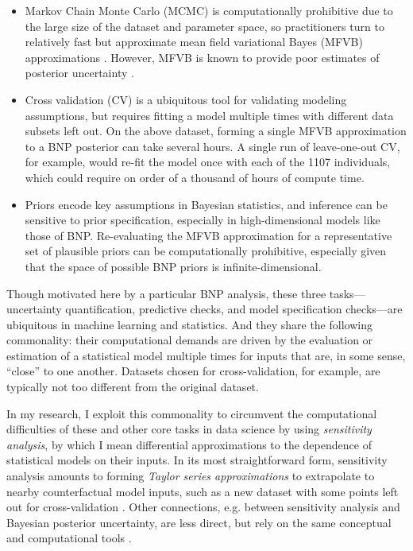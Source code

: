 \begin{itemize}
%
\item Markov Chain Monte Carlo (MCMC) is computationally prohibitive due to the
large size of the dataset and parameter space, so practitioners turn to
relatively fast but approximate mean field variational Bayes (MFVB)
approximations \citep{blei:2006:bnp, raj:2014:faststructure}. However, MFVB is
known to provide poor estimates of posterior uncertainty
\citep{turner:2011:two}.
%
\item Cross validation (CV) is a ubiquitous tool for validating modeling
assumptions, but requires fitting a model multiple times with different data
subsets left out.  On the above dataset, forming a single MFVB approximation to
a BNP posterior can take several hours.  A single run of leave-one-out CV, for
example, would re-fit the model once with each of the 1107 individuals, which
could require on order of a thousand of hours of compute time.
%
\item  Priors encode key assumptions in Bayesian statistics, and inference can
be sensitive to prior specification, especially in high-dimensional models
like those of BNP.
Re-evaluating the MFVB approximation for a representative set of
plausible priors can be computationally prohibitive, especially given that the
space of possible BNP priors is infinite-dimensional.
%
\end{itemize}

Though motivated here by a particular BNP analysis, these three
tasks---uncertainty quantification, predictive checks, and model specification
checks---are ubiquitous in machine learning and statistics.  And they share the
following commonality: their computational demands are driven by the evaluation
or estimation of a statistical model multiple times for inputs that are, in some
sense, ``close'' to one another. Datasets chosen for cross-validation, for
example, are typically not too different from the original dataset.

In my research, I exploit this commonality to circumvent the computational
difficulties of these and other core tasks in data science by using {\em
sensitivity analysis}, by which I mean differential approximations to the
dependence of statistical models on their inputs.  In its most straightforward
form, sensitivity analysis amounts to forming {\em Taylor series approximations}
to extrapolate to nearby counterfactual model inputs, such as a new dataset with
some points left out for cross-validation \citep{giordano:2018:bnpsensitivity,
giordano:2019:ij}.  Other connections, e.g. between sensitivity analysis and
Bayesian posterior uncertainty, are less direct, but rely on the same conceptual
and computational tools \citep{giordano:2018:covariances}.

